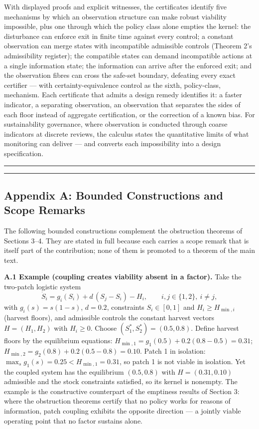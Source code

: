 \documentclass[11pt]{article}
\begin{document}
With displayed proofs and explicit witnesses, the certificates identify
five mechanisms by which an observation structure can make robust
viability impossible, plus one through which the policy class alone
empties the kernel: the disturbance can enforce exit in finite time
against every control; a constant observation can merge states with
incompatible admissible controls (Theorem 2's admissibility register);
the compatible states can demand incompatible actions at a single
information state; the information can arrive after the enforced exit;
and the observation fibres can cross the safe-set boundary, defeating
every exact certifier --- with certainty-equivalence control as the
sixth, policy-class, mechanism. Each certificate that admits a design
remedy identifies it: a faster indicator, a separating observation, an
observation that separates the sides of each floor instead of aggregate
certification, or the correction of a known bias. For sustainability
governance, where observation is conducted through coarse indicators at
discrete reviews, the calculus states the quantitative limits of what
monitoring can deliver --- and converts each impossibility into a design
specification.

\begin{center}\rule{0.5\linewidth}{0.5pt}\end{center}

\begin{center}\rule{0.5\linewidth}{0.5pt}\end{center}

\subsection{Appendix A: Bounded Constructions and Scope
Remarks}\label{appendix-a-bounded-constructions-and-scope-remarks}

The following bounded constructions complement the obstruction theorems
of Sections 3--4. They are stated in full because each carries a scope
remark that is itself part of the contribution; none of them is promoted
to a theorem of the main text.

\textbf{A.1 Example (coupling creates viability absent in a factor).}
Take the two-patch logistic system
\[\dot S_i = g_i(S_i) + d\,(S_j - S_i) - H_i, \qquad i, j \in \{1,2\},\ i \ne j,\]
with \(g_i(s) = s(1-s)\), \(d = 0.2\), constraints \(S_i \in [0,1]\) and
\(H_i \ge H_{\min,i}\) (harvest floors), and admissible controls the
constant harvest vectors \(H = (H_1, H_2)\) with \(H_i \ge 0\). Choose
\((S_1^*, S_2^*) = (0.5, 0.8)\). Define harvest floors by the
equilibrium equations:
\(H_{\min,1} = g_1(0.5) + 0.2(0.8 - 0.5) = 0.31\);
\(H_{\min,2} = g_2(0.8) + 0.2(0.5 - 0.8) = 0.10\). Patch 1 in isolation:
\(\max_s g_1(s) = 0.25 < H_{\min,1} = 0.31\), so patch 1 is not viable
in isolation. Yet the coupled system has the equilibrium \((0.5, 0.8)\)
with \(H = (0.31, 0.10)\) admissible and the stock constraints
satisfied, so its kernel is nonempty. The example is the constructive
counterpart of the emptiness results of Section 3: where the obstruction
theorems certify that no policy works for reasons of information, patch
coupling exhibits the opposite direction --- a jointly viable operating
point that no factor sustains alone.
\end{document}

